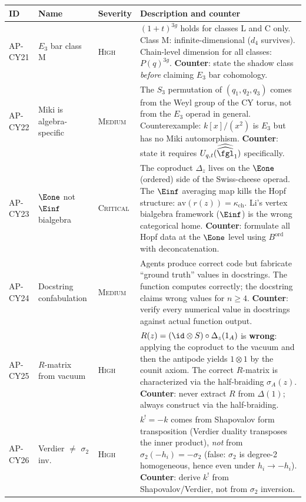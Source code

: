 {%
\small
\begin{longtable}{@{}p{1.6cm}p{2.4cm}lp{7.4cm}@{}}
\toprule
\textbf{ID} & \textbf{Name} & \textbf{Severity}
  & \textbf{Description and counter} \\
\midrule
\endhead
AP-CY21 & $E_3$ bar class M & \textsc{High} &
  $(1+t)^{3g}$ holds for classes L and C only.
  Class M: infinite-dimensional ($d_4$ survives).
  Chain-level dimension for all classes: $P(q)^{3g}$.
  \textbf{Counter}: state the shadow class \emph{before}
  claiming $E_3$ bar cohomology. \\
\midrule
AP-CY22 & Miki is algebra-specific & \textsc{Medium} &
  The $S_3$ permutation of $(q_1, q_2, q_3)$ comes from the
  Weyl group of the CY torus, not from the $E_3$ operad in
  general.  Counterexample: $k[x]/(x^2)$ is $E_3$ but has
  no Miki automorphism.
  \textbf{Counter}: state it requires
  $U_{q,t}(\widehat{\widehat{\fgl}}_1)$ specifically. \\
\midrule
AP-CY23 & $\Eone$ not $\Einf$ bialgebra & \textsc{Critical} &
  The coproduct $\Delta_z$ lives on the $\Eone$ (ordered)
  side of the Swiss-cheese operad.  The $\Einf$ averaging
  map kills the Hopf structure:
  $\mathrm{av}(r(z)) = \kappa_{\mathrm{ch}}$.
  Li's vertex bialgebra framework ($\Einf$) is the wrong
  categorical home.
  \textbf{Counter}: formulate all Hopf data at the $\Eone$
  level using $B^{\mathrm{ord}}$ with deconcatenation. \\
\midrule
AP-CY24 & Docstring confabulation & \textsc{Medium} &
  Agents produce correct code but fabricate ``ground truth''
  values in docstrings.  The function computes correctly; the
  docstring claims wrong values for $n \ge 4$.
  \textbf{Counter}: verify every numerical value in docstrings
  against actual function output. \\
\midrule
AP-CY25 & $R$-matrix from vacuum & \textsc{High} &
  $R(z) = (\id \otimes S) \circ \Delta_z(1_A)$ is
  \textbf{wrong}: applying the coproduct to the vacuum and
  then the antipode yields $1 \otimes 1$ by the counit axiom.
  The correct $R$-matrix is characterized via the
  half-braiding $\sigma_A(z)$.
  \textbf{Counter}: never extract $R$ from $\Delta(1)$;
  always construct via the half-braiding. \\
\midrule
AP-CY26 & Verdier $\neq$ $\sigma_2$ inv. & \textsc{High} &
  $k^! = -k$ comes from Shapovalov form transposition
  (Verdier duality transposes the inner product), \emph{not}
  from $\sigma_2(-h_i) = -\sigma_2$ (false: $\sigma_2$ is
  degree-2 homogeneous, hence even under $h_i \to -h_i$).
  \textbf{Counter}: derive $k^!$ from Shapovalov/Verdier,
  not from $\sigma_2$ inversion. \\
\bottomrule
\end{longtable}
}%

